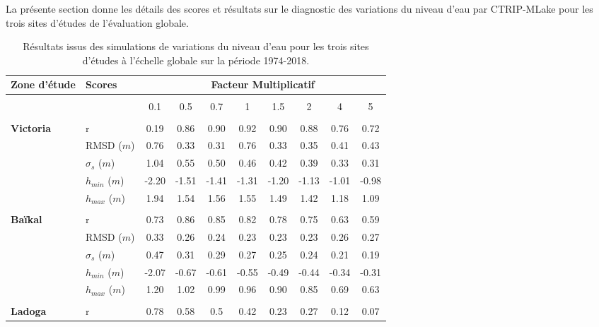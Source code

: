 La présente section donne les détails des scores et résultats sur le diagnostic des variations du niveau d'eau par CTRIP-MLake pour les trois sites d'études de l'évaluation globale.\\

\begin{table}[h!]
\caption{Résultats issus des simulations de variations du niveau d'eau pour les trois sites d'études à l'échelle globale sur la période 1974-2018.}
\begin{tabular*}{\linewidth}{ @{\extracolsep{\fill}} ll *{8}c @{}}
\toprule
Zone d'étude & Scores & \multicolumn{8}{c}{Facteur Multiplicatif}\\
\midrule \midrule \addlinespace \\
 & & 0.1 & 0.5 & 0.7 & 1 & 1.5 & 2 & 4 & 5\\
\cmidrule{3-10}
\addlinespace \\
\multirow{5}{*}{\textbf{Victoria}} & r & 0.19 & 0.86 & 0.90 & 0.92 & 0.90 & 0.88 & 0.76 & 0.72 \\
                         & RMSD ($m$) & 0.76 & 0.33 & 0.31 & 0.76 & 0.33 & 0.35 & 0.41 & 0.43  \\
                         & $\sigma_{s}$ ($m$) & 1.04 & 0.55 & 0.50 & 0.46 & 0.42 & 0.39 & 0.33 & 0.31  \\
                         & $h_{min}$ ($m$) & -2.20 & -1.51 & -1.41 & -1.31 & -1.20 & -1.13 & -1.01 & -0.98   \\
                         & $h_{max}$ ($m$) & 1.94 & 1.54 & 1.56 & 1.55 & 1.49 & 1.42 & 1.18 & 1.09 \\
                         \midrule \addlinespace \\
\multirow{5}{*}{\textbf{Baïkal}} & r & 0.73 & 0.86 & 0.85 & 0.82 & 0.78 & 0.75 & 0.63 & 0.59\\
                         & RMSD ($m$) & 0.33 & 0.26 & 0.24 & 0.23 & 0.23 & 0.23 & 0.26 & 0.27  \\
                         & $\sigma_{s}$ ($m$) & 0.47 & 0.31 & 0.29 & 0.27 & 0.25 & 0.24 & 0.21 & 0.19  \\
                         & $h_{min}$ ($m$) & -2.07 & -0.67 & -0.61 & -0.55 & -0.49 & -0.44 & -0.34 & -0.31  \\
                         & $h_{max}$ ($m$) & 1.20 & 1.02 & 0.99 & 0.96 & 0.90 & 0.85 & 0.69 & 0.63  \\
                         \midrule \addlinespace \\
\multirow{5}{*}{\textbf{Ladoga}} & r  & 0.78 & 0.58 & 0.5 & 0.42 & 0.23 & 0.27 & 0.12 & 0.07\\

\end{tabular*}
\end{table}
